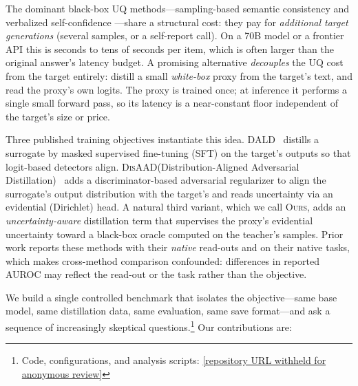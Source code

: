 \documentclass[11pt]{article}
\newcommand{\ours}{\textsc{Ours}}
\newcommand{\dald}{\textsc{DALD}}
\newcommand{\disaad}{\textsc{DisAAD}}
\begin{document}
The dominant black-box UQ methods---sampling-based semantic consistency
\citep{kuhn2023semantic,farquhar2024detecting,lin2024generating} and verbalized
self-confidence \citep{lin2022teaching}---share a structural cost: they pay for
\emph{additional target generations} (several samples, or a self-report call). On a
70B model or a frontier API this is seconds to tens of seconds per item, which is
often larger than the original answer's latency budget. A promising alternative
\emph{decouples} the UQ cost from the target entirely: distill a small \emph{white-box}
proxy from the target's text, and read the proxy's own logits. The proxy is trained
once; at inference it performs a single small forward pass, so its latency is a
near-constant floor independent of the target's size or price.

Three published training objectives instantiate this idea.
\dald~\citep{zeng2024dald} distills a surrogate by masked supervised fine-tuning
(SFT) on the target's outputs so that logit-based detectors align.
\disaad (Distribution-Aligned Adversarial Distillation)~\citep{cui2026disaad} adds a
discriminator-based adversarial regularizer to align the surrogate's output distribution
with the target's and reads uncertainty via an evidential (Dirichlet) head. A natural
third variant, which we call \ours, adds an
\emph{uncertainty-aware} distillation term that supervises the proxy's evidential
uncertainty toward a black-box oracle computed on the teacher's samples. Prior work
reports these methods with their \emph{native} read-outs and on their native tasks,
which makes cross-method comparison confounded: differences in reported AUROC may
reflect the read-out or the task rather than the objective.

We build a single controlled benchmark that isolates the objective---same base model,
same distillation data, same evaluation, same save format---and ask a sequence of
increasingly skeptical questions.\footnote{Code, configurations, and analysis scripts:
\url{[repository URL withheld for anonymous review]}} Our contributions are:
\end{document}
